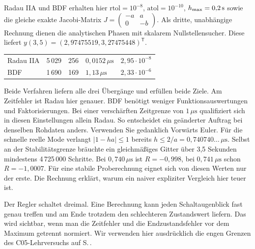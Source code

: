 Radau IIA und BDF erhalten hier \(\mathrm{rtol}=10^{-8}\), \(\mathrm{atol}=10^{-10}\), \(h_\mathrm{max}=0{,}2\,\mathrm{s}\) sowie die gleiche exakte Jacobi-Matrix \(J=\left(\begin{smallmatrix}-a&a\\0&-b\end{smallmatrix}\right)\). Als dritte, unabhängige Rechnung dienen die analytischen Phasen mit skalarem Nullstellensucher. Diese liefert \(y(3{,}5)=(2{,}97475519,3{,}27475448)^\mathsf T\).
{\tblstart\begin{tabularx}{\linewidth}{@{}lrrYY@{}}\toprule
{}&&&&\\\midrule
Radau IIA&5\,029&256&\(0{,}0152\,\mu\mathrm s\)&\(2{,}95\cdot10^{-8}\)\\
BDF&1\,690&169&\(1{,}13\,\mu\mathrm s\)&\(2{,}33\cdot10^{-6}\)\\\bottomrule\end{tabularx}\par}
Beide Verfahren liefern alle drei Übergänge und erfüllen beide Ziele. Am Zeitfehler ist Radau hier genauer. BDF benötigt weniger Funktionsauswertungen und Faktorisierungen. Bei einer verschärften Zeitgrenze von \(1\,\mu\mathrm s\) qualifiziert sich in diesen Einstellungen allein Radau. So entscheidet ein geänderter Auftrag bei denselben Rohdaten anders.
Verwenden Sie gedanklich Vorwärts Euler. Für die schnelle reelle Mode verlangt \(|1-ha|\le1\) bereits \(h\le 2/a=0{,}740740\ldots\,\mu\mathrm s\). Selbst an der Stabilitätsgrenze bräuchte ein gleichmäßiges Gitter über 3,5 Sekunden mindestens 4\,725\,000 Schritte. Bei \(0{,}740\,\mu\mathrm s\) ist \(R=-0{,}998\), bei \(0{,}741\,\mu\mathrm s\) schon \(R=-1{,}0007\). Für eine stabile Proberechnung eignet sich von diesen Werten nur der erste. Die Rechnung erklärt, warum ein naiver expliziter Vergleich hier teuer ist.

Der Regler schaltet dreimal. Eine Berechnung kann jeden Schaltaugenblick fast genau treffen und am Ende trotzdem den schlechteren Zustandswert liefern. Das wird sichtbar, wenn man die Zeitfehler und die Endzustandsfehler vor dem Maximum getrennt normiert. Wir verwenden hier ausdrücklich die engen Grenzen des C05-Lehrversuchs auf S.\,.

